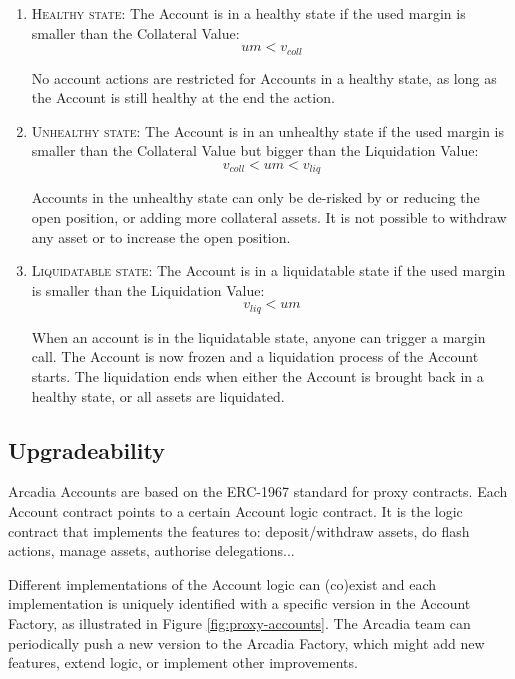 \documentclass[sigconf,nonacm]{acmart}
\begin{document}
\begin{enumerate}
    \item \textsc{Healthy state:} The Account is in a healthy state if the used margin is smaller than the Collateral Value:
        \begin{equation}
            um < v_{coll}
        \end{equation}

        No account actions are restricted for Accounts in a healthy state, as long as the Account is still healthy at the end the action.
    \item \textsc{Unhealthy state:} The Account is in an unhealthy state if the used margin is smaller than the Collateral Value but bigger than the Liquidation Value:
        \begin{equation}
            v_{coll} < um < v_{liq}
        \end{equation}
        
        Accounts in the unhealthy state can only be de-risked by or reducing the open position, or adding more collateral assets.
        It is not possible to withdraw any asset or to increase the open position.
    \item \textsc{Liquidatable state:} The Account is in a liquidatable state if the used margin is smaller than the Liquidation Value:
        \begin{equation}
            v_{liq} < um
        \end{equation}
        
        When an account is in the liquidatable state, anyone can trigger a margin call.
        The Account is now frozen and a liquidation process of the Account starts.
        The liquidation ends when either the Account is brought back in a healthy state, or all assets are liquidated.
\end{enumerate}

\subsection{Upgradeability}
\label{subsec:upgradeability}

Arcadia Accounts are based on the ERC-1967 standard for proxy contracts.
Each Account contract points to a certain Account logic contract.
It is the logic contract that implements the features to: deposit/withdraw assets, do flash actions, manage assets, authorise delegations...

Different implementations of the Account logic can (co)exist and each implementation is uniquely identified with a specific version in the Account Factory,
as illustrated in Figure \ref{fig:proxy-accounts}.
The Arcadia team can periodically push a new version to the Arcadia Factory, which might add new features, extend logic, or implement other improvements.
\end{document}
